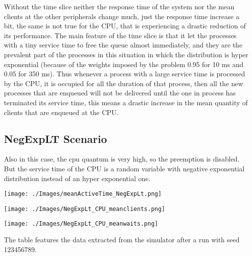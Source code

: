 \documentclass[12pt,a4paper]{article}
\begin{document}
Without the time slice neither the response time of the system nor the mean clients at the other peripherals change much, just the response time increase a bit, the same is not true for the CPU, that is experiencing a drastic reduction of its performance. The main feature of the time slice is that it let the processes with a tiny service time to free the queue almost immediately, and they are the prevalent part of the processes in this situation in which the distribution is hyper exponential (because of the weights imposed by the problem 0.95 for 10 ms and 0.05 for 350 ms). Thus whenever a process with a large service time is processed by the CPU, it is occupied for all the duration of that process, then all the new processes that are enqueued will not be delivered until the one in process has terminated its service time, this means a drastic increase in the mean quantity of clients that are enqueued at the CPU.


\subsection{NegExpLT Scenario}

Also in this case, the cpu quantum is very high, so the preemption is disabled. But the service time of the CPU is a random variable with negative exponential distribution instead of an hyper exponential one.

\texttt{[image: ./Images/meanActiveTime\_NegExpLt.png]}

\texttt{[image: ./Images/NegExpLt\_CPU\_meanclients.png]}

\texttt{[image: ./Images/NegExpLt\_CPU\_meanwaits.png]}

The table features the data extracted from the simulator after a run with seed 123456789.
\end{document}
